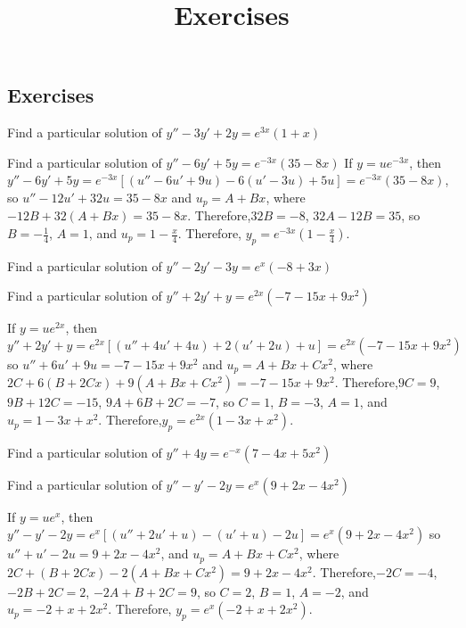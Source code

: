 \documentclass{ximera}
\title{Exercises} \license{CC BY-NC-SA 4.0}
\begin{document}
\begin{abstract}
\end{abstract}
\maketitle

\begin{onlineOnly}
\section*{Exercises}
\end{onlineOnly}


\begin{problem}\label{exer:5.4.1} Find a particular
solution of $y''-3y'+2y=e^{3x}(1+x)$
\end{problem}
 \begin{problem}\label{exer:5.4.2} Find a particular
solution of $y''-6y'+5y=e^{-3x}(35-8x)$
If $y=ue^{-3x}$, then
$y''-6y'+5y=e^{-3x}\left[(u''-6u'+9u)-6(u'-3u)+5u\right]=
e^{-3x}(35-8x)$, so $u''-12u'+32u =35-8x$ and $u_p=A+Bx$, where
$-12B+32(A+Bx)=35-8x$. Therefore,$32B=-8$, $32A-12B=35$, so
$B=-\frac{1}{4}$, $A=1$, and $u_p=1-\frac{x}{4}$. Therefore,
$y_p=e^{-3x}\left(1-\frac{x}{4}\right)$.
\end{problem}

\begin{problem}\label{exer:5.4.3} Find a particular
solution of $y''-2y'-3y=e^x(-8+3x)$
\end{problem}

\begin{problem}\label{exer:5.4.4} Find a particular
solution of $y''+2y'+y=e^{2x}(-7-15x+9x^2)$
\begin{solution}
If $y=ue^{2x}$, then
$y''+2y'+y=e^{2x}\left[(u''+4u'+4u)+2(u'+2u)+u\right]=
e^{2x}(-7-15x+9x^2)$ so $u''+6u'+9u =-7-15x+9x^2$ and $u_p=A+Bx+Cx^2$,
where $2C+6(B+2Cx)+9(A+Bx+Cx^2)=-7-15x+9x^2$. Therefore,$9C=9$,
$9B+12C=-15$, $9A+6B+2C=-7$, so $C=1$, $B=-3$, $A=1$, and
$u_p=1-3x+x^2$. Therefore,$y_p=e^{2x}(1-3x+x^2)$.
\end{solution}
\end{problem}

\begin{problem}\label{exer:5.4.5} Find a particular
solution of $y''+4y=e^{-x}(7-4x+5x^2)$
\end{problem}

\begin{problem}\label{exer:5.4.6} Find a particular
solution of $y''-y'-2y=e^x(9+2x-4x^2)$
\begin{solution}
If $y=ue^x$, then $y''-y'-2y=e^x\left[(u''+2u'+u)-(u'+u)-2u\right]=
e^x(9+2x-4x^2)$ so $u''+u'-2u =9+2x-4x^2$, and $u_p=A+Bx+Cx^2$, where
$2C+(B+2Cx)-2(A+Bx+Cx^2)=9+2x-4x^2$. Therefore,$-2C=-4$, $-2B+2C=2$,
$-2A+B+2C=9$, so $C=2$, $B=1$, $A=-2$, and $u_p=-2+x+2x^2$. Therefore,
$y_p=e^x(-2+x+2x^2)$.
\end{solution}
\end{problem}
\end{document}
